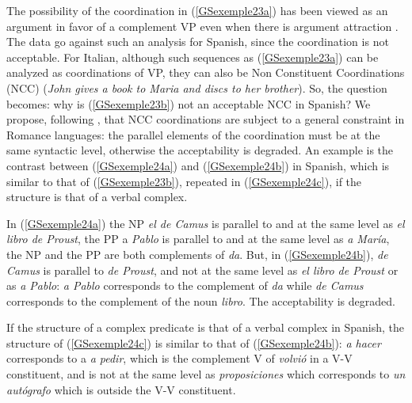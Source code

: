 \documentclass[output=paper]{langsci/langscibook}
\begin{document}
{The possibility of the coordination in (\ref{GSexemple23a}) has been viewed as an argument in favor of a complement VP even when there is argument attraction \citep{andrews1999complex}. The data go against such an analysis for Spanish, since the coordination is not acceptable. For Italian, although such sequences as (\ref{GSexemple23a}) can be analyzed as coordinations of VP, they can also be Non Constituent Coordinations (NCC) (\textit{John gives a book to Maria and discs to her brother}). So, the question becomes: why is (\ref{GSexemple23b}) not an acceptable NCC in Spanish? We propose, following \citep{AG2010}, that NCC coordinations are subject to a general constraint in Romance languages: the parallel elements of the coordination must be at the same syntactic level, otherwise the acceptability is degraded. An example is the contrast between (\ref{GSexemple24a}) and (\ref{GSexemple24b}) in Spanish, which is similar to that of (\ref{GSexemple23b}), repeated in (\ref{GSexemple24c}), if the structure is that of a verbal complex.

\begin{exe}
	\ex \label{GSexemple24} 
	\begin{xlist}
        \label{GSexemple24a}
		\label{GSexemple24b}
		\label{GSexemple24c}
	\end{xlist}
\end{exe}

In (\ref{GSexemple24a}) the NP \textit{el de Camus} is parallel to and at the same level as \textit{el libro de Proust}, the PP a \textit{Pablo} is parallel to and at the same level as \textit{a Mar\'ia}, the NP and the PP are both complements of \textit{da}. But, in (\ref{GSexemple24b}), \textit{de Camus} is parallel to \textit{de Proust}, and not at the same level as \textit{el libro de Proust} or as \textit{a Pablo}: \textit{a Pablo} corresponds to the complement of \textit{da} while \textit{de Camus} corresponds to the complement of the noun \textit{libro}. The acceptability is degraded. 

If the structure of a complex predicate is that of a verbal complex in Spanish, the structure of (\ref{GSexemple24c}) is similar to that of (\ref{GSexemple24b}): \textit{a hacer} corresponds to a \textit{a pedir}, which is the complement V of \textit{volvi\'o} in a V-V constituent, and is not at the same level as \textit{proposiciones} which corresponds to \textit{un aut\'ografo} which is outside the V-V constituent.   

}
\end{document}

